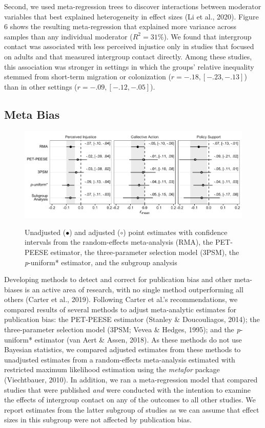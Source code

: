 \documentclass[12pt, letterpaper]{article}
\begin{document}
Second, we used meta-regression trees to discover interactions between
moderator variables that best explained heterogeneity in effect sizes
(Li et al., 2020). Figure 6 shows the resulting meta-regression that
explained more variance across samples than any individual moderator
(\(R^2 = 31\%\)). We found that intergroup contact was associated with
less perceived injustice only in studies that focused on adults and that
measured intergroup contact directly. Among these studies, this
association was stronger in settings in which the groups' relative
inequality stemmed from short-term migration or colonization
(\(r = -.18, [-.23, -.13]\)) than in other settings
(\(r = -.09, [-.12, -.05]\)).

\hypertarget{meta-bias}{%
\subsection{Meta Bias}\label{meta-bias}}

\begin{figure}
\centering
\caption{Unadjusted ($\bullet$) and adjusted ($\circ$) point estimates with confidence intervals from the random-effects meta-analysis (RMA), the PET-PEESE estimator, the three-parameter selection model (3PSM), the \textit{p}-uniform* estimator, and the subgroup analysis}
\includegraphics[scale=1]{../figures/figure-7}
\label{fig:f7}
\end{figure}

Developing methods to detect and correct for publication bias and other
meta-biases is an active area of research, with no single method
outperforming all others (Carter et al., 2019). Following Carter et
al.'s recommendations, we compared results of several methods to adjust
meta-analytic estimates for publication bias: the PET-PEESE estimator
(Stanley \& Doucouliagos, 2014); the three-parameter selection model
(3PSM; Vevea \& Hedges, 1995); and the \emph{p}-uniform* estimator (van
Aert \& Assen, 2018). As these methods do not use Bayesian statistics,
we compared adjusted estimates from these methods to unadjusted
estimates from a random-effects meta-analysis estimated with restricted
maximum likelihood estimation using the \emph{metafor} package
(Viechtbauer, 2010). In addition, we ran a meta-regression model that
compared studies that were published \emph{and} were conducted with the
intention to examine the effects of intergroup contact on any of the
outcomes to all other studies. We report estimates from the latter
subgroup of studies as we can assume that effect sizes in this subgroup
were not affected by publication bias.
\end{document}
